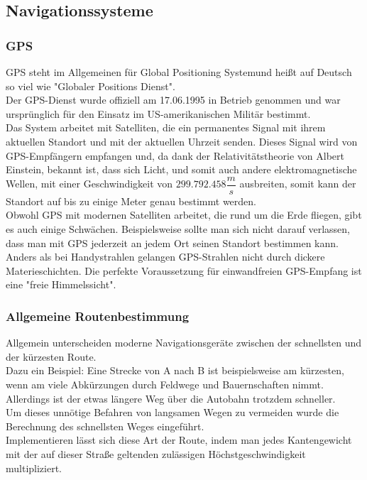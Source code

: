 \documentclass[12pt]{article}
\begin{document}
	\subsection{Navigationssysteme}
		\subsubsection{GPS}
			GPS steht im Allgemeinen für \dq Global Positioning System\dq und heißt auf Deutsch so viel wie "Globaler Positions Dienst".\\
			Der GPS-Dienst wurde offiziell am 17.06.1995 in Betrieb genommen und war ursprünglich für den Einsatz im US-amerikanischen Militär bestimmt.\\
			Das System arbeitet mit Satelliten, die ein permanentes Signal mit ihrem aktuellen Standort und mit der aktuellen Uhrzeit senden. Dieses Signal wird von GPS-Empfängern empfangen und, da dank der Relativitätstheorie von Albert Einstein, bekannt ist, dass sich Licht, und somit auch andere elektromagnetische Wellen, mit einer Geschwindigkeit von $299.792.458 \dfrac ms$ \cite{lichtgesch} ausbreiten, somit kann der Standort auf bis zu einige Meter genau bestimmt werden.\\
			Obwohl GPS mit modernen Satelliten arbeitet, die rund um die Erde fliegen, gibt es auch einige Schwächen. Beispielsweise sollte man sich nicht darauf verlassen, dass man mit GPS jederzeit an jedem Ort seinen Standort bestimmen kann. Anders als bei Handystrahlen gelangen GPS-Strahlen nicht durch dickere Materieschichten. Die perfekte Voraussetzung für einwandfreien GPS-Empfang ist eine "freie Himmelssicht". \cite{gps} 
		
		\subsubsection{Allgemeine Routenbestimmung}
			Allgemein unterscheiden moderne Navigationsgeräte zwischen der schnellsten und der kürzesten Route.\\
			Dazu ein Beispiel: Eine Strecke von A nach B ist beispielsweise am kürzesten, wenn am viele Abkürzungen durch Feldwege und Bauernschaften nimmt. Allerdings ist der etwas längere Weg über die Autobahn trotzdem schneller.\\
			Um dieses unnötige Befahren von langsamen Wegen zu vermeiden wurde die Berechnung des schnellsten Weges eingeführt.\\
			Implementieren lässt sich diese Art der Route, indem man jedes Kantengewicht mit der auf dieser Straße geltenden zulässigen Höchstgeschwindigkeit multipliziert.
\end{document}
